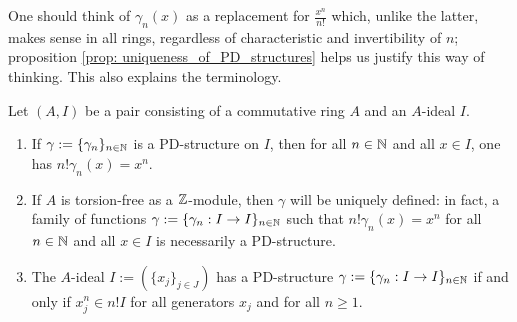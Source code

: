             \begin{remark}
                One should think of $\gamma_n(x)$ as a replacement for $\frac{x^n}{n!}$ which, unlike the latter, makes sense in all rings, regardless of characteristic and invertibility of $n$; proposition \ref{prop: uniqueness_of_PD_structures} helps us justify this way of thinking. This also explains the  terminology.
            \end{remark}
            \begin{proposition} \label{prop: uniqueness_of_PD_structures}
                Let $(A, I)$ be a pair consisting of a commutative ring $A$ and an $A$-ideal $I$.
                    \begin{enumerate}
                        \item If $\gamma := \{\gamma_n\}_{n \in \mathbb{N}}$ is a PD-structure on $I$, then for all $n \in \mathbb{N}$ and all $x \in I$, one has $n! \gamma_n(x) = x^n$.
                        \item If $A$ is torsion-free as a $\mathbb{Z}$-module, then $\gamma$ will be uniquely defined: in fact, a family of functions $\gamma := \{\gamma_n: I \to I\}_{n \in \mathbb{N}}$ such that $n! \gamma_n(x) = x^n$ for all $n \in \mathbb{N}$ and all $x \in I$ is necessarily a PD-structure. 
                        \item The $A$-ideal $I := (\{x_j\}_{j \in J})$ has a PD-structure $\gamma := \{\gamma_n: I \to I\}_{n \in \mathbb{N}}$ if and only if $x_j^n \in n! I$ for all generators $x_j$ and for all $n \geq 1$.
                    \end{enumerate}
            \end{proposition}
